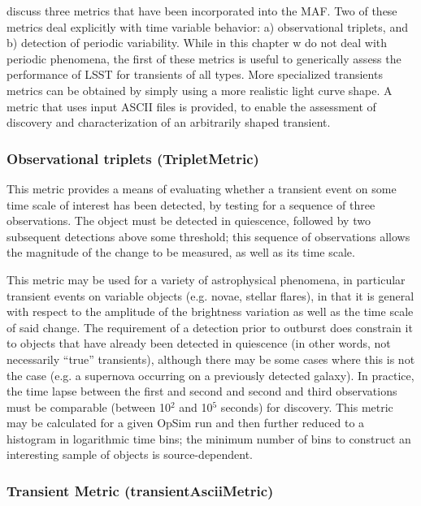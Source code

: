 \citet{2015arXiv150803175L} discuss
three metrics that have been incorporated into the MAF. Two of these
metrics deal explicitly with time variable behavior: a) observational
triplets, and b) detection of periodic variability. While in this
chapter w do not deal with periodic phenomena, the first of these
metrics is useful to generically assess the performance of LSST for
transients of all types. More specialized transients metrics can be
obtained by simply using a more realistic light curve shape. A metric
that uses input ASCII files is provided, to enable the assessment of
discovery and characterization of an arbitrarily shaped transient.

\subsubsection{Observational triplets (TripletMetric)}

This metric provides a means of evaluating whether a transient event
on some time scale of interest has been detected, by testing for a
sequence of three observations. The object must be detected in
quiescence, followed by two subsequent detections above some
threshold; this sequence of observations allows the magnitude of the
change to be measured, as well as its time scale.

This metric may be used for a variety of astrophysical phenomena, in
particular transient events on variable objects (e.g. novae, stellar
flares), in that it is general with respect to the amplitude of the
brightness variation as well as the time scale of said change. The
requirement of a detection prior to outburst does constrain it to
objects that have already been detected in quiescence (in other words,
not necessarily ``true'' transients), although there may be some cases
where this is not the case (e.g. a supernova occurring on a previously
detected galaxy). In practice, the time lapse between the first and
second and second and third observations must be comparable (between
10$^2$ and 10$^5$ seconds) for discovery. This metric may be
calculated for a given OpSim run and then further reduced to a
histogram in logarithmic time bins; the minimum number of bins to
construct an interesting sample of objects is source-dependent.

\subsubsection{Transient Metric (transientAsciiMetric)}


